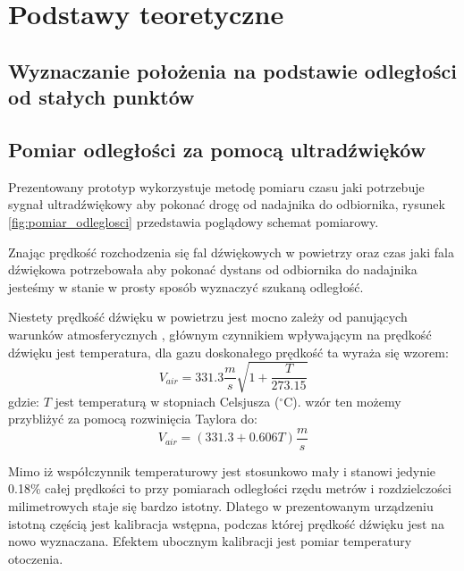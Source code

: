 \chapter{Podstawy teoretyczne}
\section{Wyznaczanie położenia na podstawie odległości od stałych punktów}



\section{Pomiar odległości za pomocą ultradźwięków}

Prezentowany prototyp wykorzystuje metodę pomiaru czasu jaki 
potrzebuje sygnał ultradźwiękowy aby pokonać drogę od nadajnika do odbiornika,
rysunek \ref{fig:pomiar_odleglosci} przedstawia poglądowy schemat pomiarowy.

Znając prędkość rozchodzenia się fal dźwiękowych w powietrzy oraz czas jaki fala dźwiękowa potrzebowała
aby pokonać dystans od odbiornika do nadajnika jesteśmy w stanie w prosty sposób wyznaczyć szukaną odległość.

Niestety prędkość dźwięku w powietrzu jest mocno zależy od panujących warunków atmosferycznych \cite{bib:soundSpeed},  
głównym czynnikiem wpływającym na prędkość dźwięku jest temperatura,
dla gazu doskonałego prędkość ta wyraża się wzorem:
\[
V_{air} = 331.3  \frac{m}{s}  \sqrt{1+\frac{T}{273.15}}
\]
gdzie: $T$ jest temperaturą w stopniach Celsjusza ($^\circ$C).
wzór ten możemy przybliżyć za pomocą rozwinięcia Taylora do:
\[
 V_{air} = (331.3  +  0.606T) \frac{m}{s}
\]

Mimo iż współczynnik temperaturowy jest stosunkowo mały i stanowi jedynie 0.18\% całej prędkości
to przy pomiarach odległości rzędu metrów i rozdzielczości milimetrowych staje się bardzo istotny. 
Dlatego w prezentowanym urządzeniu istotną częścią jest kalibracja wstępna, podczas której
prędkość dźwięku jest na nowo wyznaczana. Efektem ubocznym kalibracji jest pomiar temperatury otoczenia.



